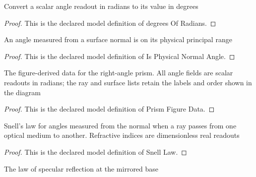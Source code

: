 \begin{definition}
  \label{def:physics:phyx-mini-0017:phyxminiproblems-problem0017-degreesofradians}
  Convert a scalar angle readout in radians to its value in degrees
\end{definition}
\begin{proof}
  This is the declared model definition of degrees Of Radians.
\end{proof}
\begin{definition}
  \label{def:physics:phyx-mini-0017:phyxminiproblems-problem0017-isphysicalnormalangle}
  An angle measured from a surface normal is on its physical principal range
\end{definition}
\begin{proof}
  This is the declared model definition of Is Physical Normal Angle.
\end{proof}
\begin{definition}
  \label{def:physics:phyx-mini-0017:phyxminiproblems-problem0017-prismfiguredata}
  The figure-derived data for the right-angle prism. All angle fields are scalar readouts in radians; the ray and surface lists retain the labels and order shown in the diagram
\end{definition}
\begin{proof}
  This is the declared model definition of Prism Figure Data.
\end{proof}
\begin{definition}
  \label{def:physics:phyx-mini-0017:phyxminiproblems-problem0017-snelllaw}
  Snell's law for angles measured from the normal when a ray passes from one optical medium to another. Refractive indices are dimensionless real readouts
\end{definition}
\begin{proof}
  This is the declared model definition of Snell Law.
\end{proof}
\begin{definition}
  \label{def:physics:phyx-mini-0017:phyxminiproblems-problem0017-specularreflectionlaw}
  The law of specular reflection at the mirrored base
\end{definition}
